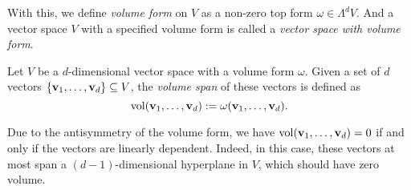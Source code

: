 With this, we define \emph{volume form} on \(V\) as a non-zero top form \(\omega \in \Lambda^d V\). And a vector space \(V\) with a specified volume form is called a \emph{vector space with volume form}.
\begin{definition}
    Let \(V\) be a \(d\)-dimensional vector space with a volume form \(\omega\). Given a set of \(d\) vectors \(\qty{\vb{v}_1, \ldots, \vb{v}_d} \subseteq V\), the \emph{volume span} of these vectors is defined as
    \begin{equation}
        \operatorname{vol}(\vb{v}_1, \ldots, \vb{v}_d) := \omega(\vb{v}_1, \ldots, \vb{v}_d).
    \end{equation}
\end{definition}
Due to the antisymmetry of the volume form, we have \(\operatorname{vol}(\vb{v}_1, \ldots, \vb{v}_d) = 0\) if and only if the vectors are linearly dependent. Indeed, in this case, these vectors at most span a \((d - 1)\)-dimensional hyperplane in \(V\), which should have zero volume.

